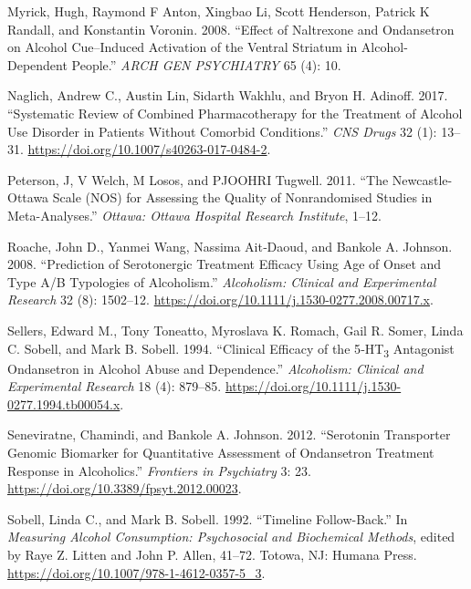 \documentclass[
  12pt,
]{article}
\newlength{\cslhangindent}
\newenvironment{CSLReferences}[2] %
 {\begin{list}{}{%
  \setlength{\itemindent}{0pt}
  \setlength{\leftmargin}{0pt}
  \setlength{\parsep}{0pt}
  \ifodd #1
   \setlength{\leftmargin}{\cslhangindent}
   \setlength{\itemindent}{-1\cslhangindent}
  \fi
  \setlength{\itemsep}{#2\baselineskip}}}
 {\end{list}}
\begin{document}
\begin{CSLReferences}{1}{0}
Myrick, Hugh, Raymond F Anton, Xingbao Li, Scott Henderson, Patrick K
Randall, and Konstantin Voronin. 2008. {``Effect of {Naltrexone} and
{Ondansetron} on {Alcohol Cue}--{Induced Activation} of the {Ventral
Striatum} in {Alcohol-Dependent People}.''} \emph{ARCH GEN PSYCHIATRY}
65 (4): 10.

Naglich, Andrew C., Austin Lin, Sidarth Wakhlu, and Bryon H. Adinoff.
2017. {``Systematic {Review} of {Combined Pharmacotherapy} for the
{Treatment} of {Alcohol Use Disorder} in {Patients Without Comorbid
Conditions}.''} \emph{CNS Drugs} 32 (1): 13--31.
\url{https://doi.org/10.1007/s40263-017-0484-2}.

Peterson, J, V Welch, M Losos, and PJOOHRI Tugwell. 2011. {``The
{Newcastle-Ottawa} Scale ({NOS}) for Assessing the Quality of
Nonrandomised Studies in Meta-Analyses.''} \emph{Ottawa: Ottawa Hospital
Research Institute}, 1--12.

Roache, John D., Yanmei Wang, Nassima Ait‐Daoud, and Bankole A. Johnson.
2008. {``Prediction of {Serotonergic Treatment Efficacy Using Age} of
{Onset} and {Type A}/{B Typologies} of {Alcoholism}.''}
\emph{Alcoholism: Clinical and Experimental Research} 32 (8): 1502--12.
\url{https://doi.org/10.1111/j.1530-0277.2008.00717.x}.

Sellers, Edward M., Tony Toneatto, Myroslava K. Romach, Gail R. Somer,
Linda C. Sobell, and Mark B. Sobell. 1994. {``Clinical {Efficacy} of the
5‐{HT}{\textsubscript{3}} {Antagonist Ondansetron} in {Alcohol Abuse}
and {Dependence}.''} \emph{Alcoholism: Clinical and Experimental
Research} 18 (4): 879--85.
\url{https://doi.org/10.1111/j.1530-0277.1994.tb00054.x}.

Seneviratne, Chamindi, and Bankole A. Johnson. 2012. {``Serotonin
{Transporter Genomic Biomarker} for {Quantitative Assessment} of
{Ondansetron Treatment Response} in {Alcoholics}.''} \emph{Frontiers in
Psychiatry} 3: 23. \url{https://doi.org/10.3389/fpsyt.2012.00023}.

Sobell, Linda C., and Mark B. Sobell. 1992. {``Timeline
{Follow-Back}.''} In \emph{Measuring {Alcohol Consumption}:
{Psychosocial} and {Biochemical Methods}}, edited by Raye Z. Litten and
John P. Allen, 41--72. Totowa, NJ: Humana Press.
\url{https://doi.org/10.1007/978-1-4612-0357-5_3}.


\end{CSLReferences}
\end{document}

